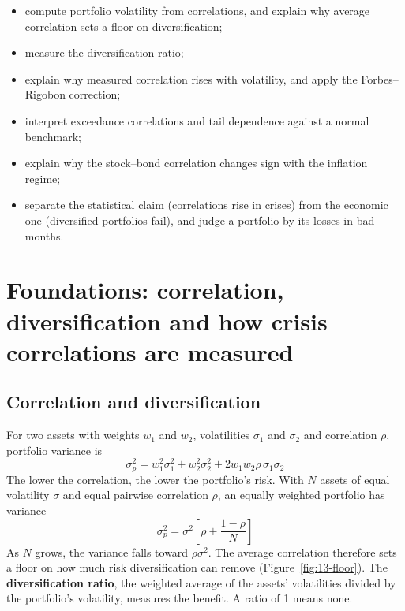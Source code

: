 \begin{itemize}
  \item compute portfolio volatility from correlations, and explain why average correlation sets a floor on diversification;
  \item measure the diversification ratio;
  \item explain why measured correlation rises with volatility, and apply the Forbes--Rigobon correction;
  \item interpret exceedance correlations and tail dependence against a normal benchmark;
  \item explain why the stock--bond correlation changes sign with the inflation regime;
  \item separate the statistical claim (correlations rise in crises) from the economic one (diversified portfolios fail), and judge a portfolio by its losses in bad months.
\end{itemize}

\section{Foundations: correlation, diversification and how crisis correlations are measured}
\label{sec:13-foundations}

\subsection{Correlation and diversification}

For two assets with weights $w_1$ and $w_2$, volatilities $\sigma_1$ and $\sigma_2$ and correlation $\rho$, portfolio variance is
\begin{equation}
  \sigma_p^2 = w_1^2\sigma_1^2 + w_2^2\sigma_2^2 + 2w_1w_2\rho\,\sigma_1\sigma_2
  \label{eq:13-var2}
\end{equation}
The lower the correlation, the lower the portfolio's risk. With $N$ assets of equal volatility $\sigma$ and equal pairwise correlation $\rho$, an equally weighted portfolio has variance
\begin{equation}
  \sigma_p^2 = \sigma^2\left[\rho + \frac{1 - \rho}{N}\right]
  \label{eq:13-varN}
\end{equation}
As $N$ grows, the variance falls toward $\rho\sigma^2$. The average correlation therefore sets a floor on how much risk diversification can remove (Figure~\ref{fig:13-floor}). The \textbf{diversification ratio}, the weighted average of the assets' volatilities divided by the portfolio's volatility, measures the benefit. A ratio of 1 means none.

